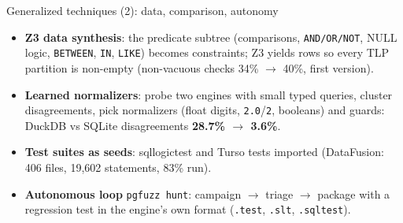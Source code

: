 \documentclass[aspectratio=169,10pt]{beamer}
\begin{document}
\begin{frame}{Generalized techniques (2): data, comparison, autonomy}
\small
\begin{itemize}
  \item \textbf{Z3 data synthesis}: the predicate subtree (comparisons, \texttt{AND/OR/NOT}, NULL logic, \texttt{BETWEEN}, \texttt{IN}, \texttt{LIKE}) becomes constraints; Z3 yields rows so every TLP partition is non-empty (non-vacuous checks 34\% $\rightarrow$ 40\%, first version).
  \item \textbf{Learned normalizers}: probe two engines with small typed queries, cluster disagreements, pick normalizers (float digits, \texttt{2.0}/\texttt{2}, booleans) and guards: DuckDB vs SQLite disagreements \textbf{28.7\% $\rightarrow$ 3.6\%}.
  \item \textbf{Test suites as seeds}: sqllogictest and Turso tests imported (DataFusion: 406 files, 19{,}602 statements, 83\% run).
  \item \textbf{Autonomous loop} \texttt{pgfuzz hunt}: campaign $\rightarrow$ triage $\rightarrow$ package with a regression test \alert{in the engine's own format} (\texttt{.test}, \texttt{.slt}, \texttt{.sqltest}).
\end{itemize}
\end{frame}
\end{document}
